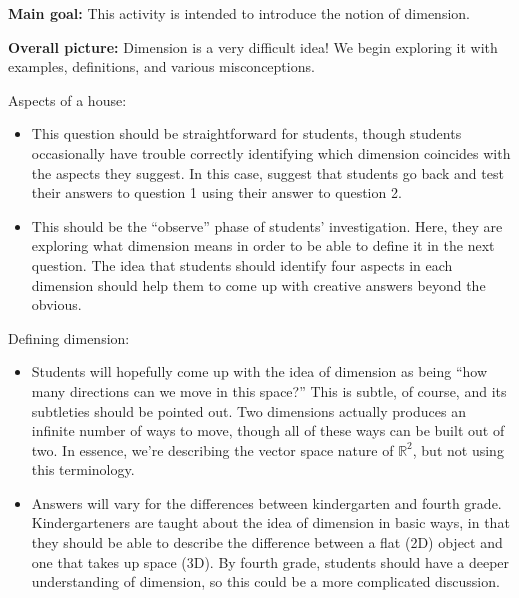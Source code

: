 \documentclass[nooutcomes,noauthor, handout]{ximera}
\begin{document}
\pagebreak
\begin{instructorNotes}
    {\bf Main goal:} This activity is intended to introduce the notion of dimension.  
    
    {\bf Overall picture:} Dimension is a very difficult idea! We begin exploring it with examples, definitions, and various misconceptions.
    
    Aspects of a house:
    \begin{itemize}
            \item This question should be straightforward for students, though students occasionally have trouble correctly identifying which dimension coincides with the aspects they suggest.  In this case, suggest that students go back and test their answers to question 1 using their answer to question 2.
        
       \item  This should be the ``observe'' phase of students' investigation.  Here, they are exploring what dimension means in order to be able to define it in the next question.  The idea that students should identify four aspects in each dimension should help them to come up with creative answers beyond the obvious.
    \end{itemize}
    
    Defining dimension:
    \begin{itemize}
            \item Students will hopefully come up with the idea of dimension as being ``how many directions can we move in this space?''  This is subtle, of course, and its subtleties should be pointed out.  Two dimensions actually produces an infinite number of ways to move, though all of these ways can be built out of two.  In essence, we're describing the vector space nature of $\mathbb{R}^2$, but not using this terminology.
        
        \item Answers will vary for the differences between kindergarten and fourth grade.  Kindergarteners are taught about the idea of dimension in basic ways, in that they should be able to describe the difference between a flat (2D) object and one that takes up space (3D).  By fourth grade, students should have a deeper understanding of dimension, so this could be a more complicated discussion.
    \end{itemize}
    

\end{instructorNotes}
\end{document}
